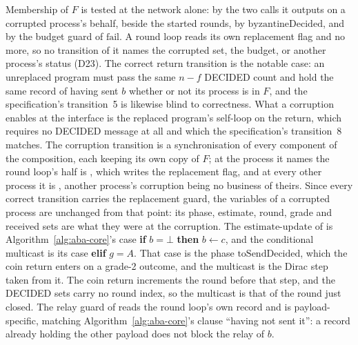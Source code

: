 Membership of $F$ is tested at the network alone: by the two calls it outputs on a corrupted process's behalf, beside the started rounds, by $\mathrm{byzantineDecided}$, and by the budget guard of $\mathrm{fail}$.
A round loop reads its own replacement flag and no more, so no transition of it names the corrupted set, the budget, or another process's status (D23).
The correct return transition is the notable case: an unreplaced program must pass the same $n - f$ DECIDED count and hold the same record of having sent $b$ whether or not its process is in $F$, and the specification's transition~5 is likewise blind to correctness.
What a corruption enables at the interface is the replaced program's self-loop on the return, which requires no DECIDED message at all and which the specification's transition~8 matches.
The corruption transition  is a synchronisation of every component of the composition, each keeping its own copy of $F$; at the process it names the round loop's half is , which writes the replacement flag, and at every other process it is , another process's corruption being no business of theirs.
Since every correct transition carries the replacement guard, the variables of a corrupted process are unchanged from that point: its phase, estimate, round, grade and received sets are what they were at the corruption.
The $\mathrm{estimate}$-update of  is Algorithm~\ref{alg:aba-core}'s case \textbf{if} $b = \bot$ \textbf{then} $b \gets c$, and the conditional multicast is its case \textbf{elif} $g = A$.
That case is the phase $\mathrm{toSendDecided}$, which the coin return enters on a grade-2 outcome, and the multicast is the Dirac step  taken from it.
The coin return increments the round before that step, and the DECIDED sets carry no round index, so the multicast is that of the round just closed.
The relay guard of  reads the round loop's own record and is payload-specific, matching Algorithm~\ref{alg:aba-core}'s clause ``having not sent it'': a record already holding the other payload does not block the relay of $b$.


